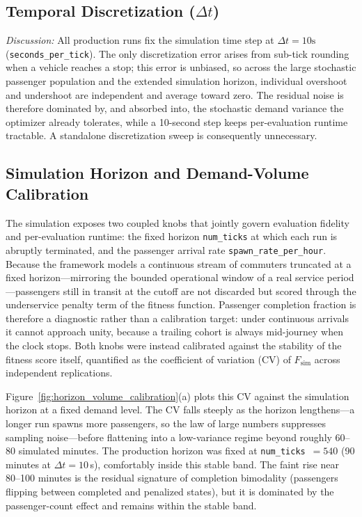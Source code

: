 \subsection{Temporal Discretization ($\Delta t$)}
\textit{Discussion:} All production runs fix the simulation time step at $\Delta t = 10\text{s}$ (\texttt{seconds\_per\_tick}). The only discretization error arises from sub-tick rounding when a vehicle reaches a stop; this error is unbiased, so across the large stochastic passenger population and the extended simulation horizon, individual overshoot and undershoot are independent and average toward zero. The residual noise is therefore dominated by, and absorbed into, the stochastic demand variance the optimizer already tolerates, while a 10-second step keeps per-evaluation runtime tractable. A standalone discretization sweep is consequently unnecessary.

\subsection{Simulation Horizon and Demand-Volume Calibration}
The simulation exposes two coupled knobs that jointly govern evaluation fidelity and per-evaluation runtime: the fixed horizon \texttt{num\_ticks} at which each run is abruptly terminated, and the passenger arrival rate \texttt{spawn\_rate\_per\_hour}. Because the framework models a continuous stream of commuters truncated at a fixed horizon---mirroring the bounded operational window of a real service period---passengers still in transit at the cutoff are not discarded but scored through the underservice penalty term of the fitness function. Passenger completion fraction is therefore a diagnostic rather than a calibration target: under continuous arrivals it cannot approach unity, because a trailing cohort is always mid-journey when the clock stops. Both knobs were instead calibrated against the stability of the fitness score itself, quantified as the coefficient of variation (CV) of $F_{\text{sim}}$ across independent replications.

Figure~\ref{fig:horizon_volume_calibration}(a) plots this CV against the simulation horizon at a fixed demand level. The CV falls steeply as the horizon lengthens---a longer run spawns more passengers, so the law of large numbers suppresses sampling noise---before flattening into a low-variance regime beyond roughly 60--80 simulated minutes. The production horizon was fixed at \texttt{num\_ticks}~$=540$ (90 minutes at $\Delta t = 10$\,s), comfortably inside this stable band. The faint rise near 80--100 minutes is the residual signature of completion bimodality (passengers flipping between completed and penalized states), but it is dominated by the passenger-count effect and remains within the stable band.

